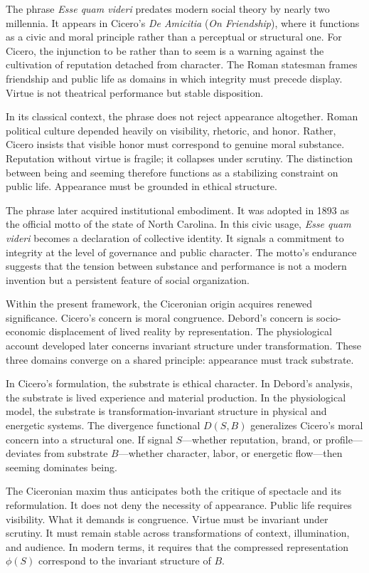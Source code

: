 \documentclass[11pt]{article}
\begin{document}
The phrase \textit{Esse quam videri} predates modern social theory by nearly two millennia. It appears in Cicero's \textit{De Amicitia} (\textit{On Friendship}), where it functions as a civic and moral principle rather than a perceptual or structural one. For Cicero, the injunction to be rather than to seem is a warning against the cultivation of reputation detached from character. The Roman statesman frames friendship and public life as domains in which integrity must precede display. Virtue is not theatrical performance but stable disposition.

In its classical context, the phrase does not reject appearance altogether. Roman political culture depended heavily on visibility, rhetoric, and honor. Rather, Cicero insists that visible honor must correspond to genuine moral substance. Reputation without virtue is fragile; it collapses under scrutiny. The distinction between being and seeming therefore functions as a stabilizing constraint on public life. Appearance must be grounded in ethical structure.

The phrase later acquired institutional embodiment. It was adopted in 1893 as the official motto of the state of North Carolina. In this civic usage, \textit{Esse quam videri} becomes a declaration of collective identity. It signals a commitment to integrity at the level of governance and public character. The motto's endurance suggests that the tension between substance and performance is not a modern invention but a persistent feature of social organization.

Within the present framework, the Ciceronian origin acquires renewed significance. Cicero's concern is moral congruence. Debord's concern is socio-economic displacement of lived reality by representation. The physiological account developed later concerns invariant structure under transformation. These three domains converge on a shared principle: appearance must track substrate.

In Cicero's formulation, the substrate is ethical character. In Debord's analysis, the substrate is lived experience and material production. In the physiological model, the substrate is transformation-invariant structure in physical and energetic systems. The divergence functional $D(S,B)$ generalizes Cicero's moral concern into a structural one. If signal $S$---whether reputation, brand, or profile---deviates from substrate $B$---whether character, labor, or energetic flow---then seeming dominates being.

The Ciceronian maxim thus anticipates both the critique of spectacle and its reformulation. It does not deny the necessity of appearance. Public life requires visibility. What it demands is congruence. Virtue must be invariant under scrutiny. It must remain stable across transformations of context, illumination, and audience. In modern terms, it requires that the compressed representation $\phi(S)$ correspond to the invariant structure of $B$.
\end{document}
